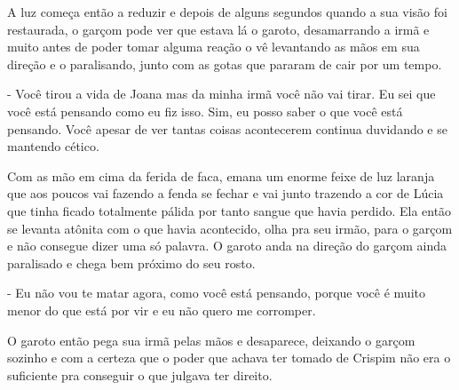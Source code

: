 A luz começa então a reduzir e depois de alguns segundos quando a sua visão foi restaurada, o garçom pode ver que estava lá o garoto, desamarrando a irmã e muito antes de poder tomar alguma reação o vê levantando as mãos em sua direção e o paralisando, junto com as gotas que pararam de cair por um tempo.

- Você tirou a vida de Joana mas da minha irmã você não vai tirar. Eu sei que você está pensando como eu fiz isso. Sim, eu posso saber o que você está pensando. Você apesar de ver tantas coisas acontecerem continua duvidando e se mantendo cético.

Com as mão em cima da ferida de faca, emana um enorme feixe de luz laranja que aos poucos vai fazendo a fenda se fechar e vai junto trazendo a cor de Lúcia que tinha ficado totalmente pálida por tanto sangue que havia perdido. Ela então se levanta atônita com o que havia acontecido, olha pra seu irmão, para o garçom e não consegue dizer uma só palavra. O garoto anda na direção do garçom ainda paralisado e chega bem próximo do seu rosto.

- Eu não vou te matar agora, como você está pensando, porque você é muito menor do que está por vir e eu não quero me corromper. 

O garoto então pega sua irmã pelas mãos e desaparece, deixando o garçom sozinho e com a certeza que o poder que achava ter tomado de Crispim não era o suficiente pra conseguir o que julgava ter direito.
